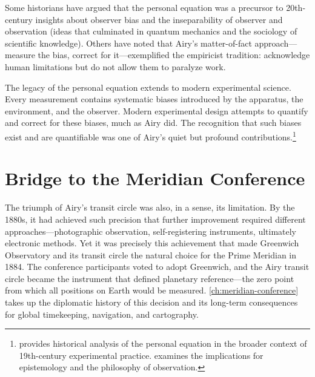 Some historians have argued that the personal equation was a precursor to 20th-century insights about observer bias and the inseparability of observer and observation (ideas that culminated in quantum mechanics and the sociology of scientific knowledge). Others have noted that Airy's matter-of-fact approach—measure the bias, correct for it—exemplified the empiricist tradition: acknowledge human limitations but do not allow them to paralyze work.

The legacy of the personal equation extends to modern experimental science. Every measurement contains systematic biases introduced by the apparatus, the environment, and the observer. Modern experimental design attempts to quantify and correct for these biases, much as Airy did. The recognition that such biases exist and are quantifiable was one of Airy's quiet but profound contributions.\footnote{\textcite{Olesko2015} provides historical analysis of the personal equation in the broader context of 19th-century experimental practice. \textcite{Schaffer1994} examines the implications for epistemology and the philosophy of observation.}

\section{Bridge to the Meridian Conference}

The triumph of Airy's transit circle was also, in a sense, its limitation. By the 1880s, it had achieved such precision that further improvement required different approaches—photographic observation, self-registering instruments, ultimately electronic methods. Yet it was precisely this achievement that made Greenwich Observatory and its transit circle the natural choice for the Prime Meridian in 1884. The conference participants voted to adopt Greenwich, and the Airy transit circle became the instrument that defined planetary reference—the zero point from which all positions on Earth would be measured. \cref{ch:meridian-conference} takes up the diplomatic history of this decision and its long-term consequences for global timekeeping, navigation, and cartography.
